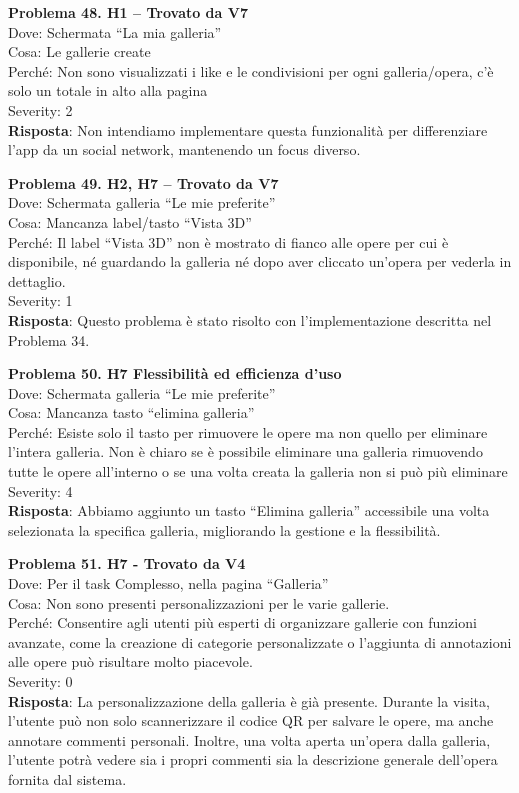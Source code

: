 \documentclass{article}
\begin{document}
\noindent \textbf{Problema 48. H1 – Trovato da V7} \\
Dove: Schermata “La mia galleria” \\
Cosa: Le gallerie create \\
Perché: Non sono visualizzati i like e le condivisioni per ogni galleria/opera, c’è solo un totale in alto alla pagina \\
Severity: 2 \\
\textbf{Risposta}: Non intendiamo implementare questa funzionalità per differenziare l’app da un social network, mantenendo un focus diverso.

\noindent \textbf{Problema 49. H2, H7 – Trovato da V7} \\
Dove: Schermata galleria “Le mie preferite” \\
Cosa: Mancanza label/tasto “Vista 3D” \\
Perché: Il label “Vista 3D” non è mostrato di fianco alle opere per cui è disponibile, né guardando la galleria né dopo aver cliccato un’opera per vederla in dettaglio. \\
Severity: 1 \\
\textbf{Risposta}: Questo problema è stato risolto con l’implementazione descritta nel Problema 34.

\noindent \textbf{Problema 50. H7 Flessibilità ed efficienza d’uso} \\
Dove: Schermata galleria “Le mie preferite” \\
Cosa: Mancanza tasto “elimina galleria” \\
Perché: Esiste solo il tasto per rimuovere le opere ma non quello per eliminare l’intera galleria. Non è chiaro se è possibile eliminare una galleria rimuovendo tutte le opere all’interno o se una volta creata la galleria non si può più eliminare \\
Severity: 4 \\
\textbf{Risposta}: Abbiamo aggiunto un tasto “Elimina galleria” accessibile una volta selezionata la specifica galleria, migliorando la gestione e la flessibilità.

\noindent \textbf{Problema 51. H7 - Trovato da V4} \\
Dove: Per il task Complesso, nella pagina “Galleria” \\
Cosa: Non sono presenti personalizzazioni per le varie gallerie. \\
Perché: Consentire agli utenti più esperti di organizzare gallerie con funzioni avanzate, come la creazione di categorie personalizzate o l’aggiunta di annotazioni alle opere può risultare molto piacevole. \\
Severity: 0 \\
\textbf{Risposta}: La personalizzazione della galleria è già presente. Durante la visita, l’utente può non solo scannerizzare il codice QR per salvare le opere, ma anche annotare commenti personali. Inoltre, una volta aperta un’opera dalla galleria, l’utente potrà vedere sia i propri commenti sia la descrizione generale dell’opera fornita dal sistema.
\end{document}
